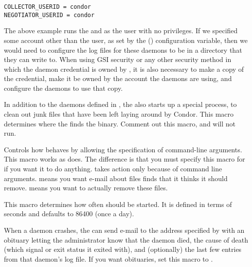 \begin{description}
\begin{verbatim}
COLLECTOR_USERID = condor
NEGOTIATOR_USERID = condor
\end{verbatim}

  The above example runs the  and 
  as the  user with no  privileges.
  If we specified some account other than the  user,
  as set by the () configuration variable, then we
  would need to configure the log files for these daemons to be in a
  directory that they can write to.  When using GSI security or any
  other security method in which the daemon credential is owned by ,
  it is also necessary to make a copy of the credential, make it be
  owned by the account the daemons are using, and configure the daemons
  to use that copy.

\label{param:Preen}
\item[\Macro{PREEN}]
  In addition to the daemons
  defined in , the  also starts up
  a special process,  to clean out junk files that have
  been left laying around by Condor.  This macro determines where the
   finds the  binary.
  Comment out this macro, and  will not run.

\label{param:PreenArgs}
\item[\Macro{PREEN\_ARGS}]
  Controls how  behaves by allowing the specification
  of command-line arguments.
  This macro works as  does.
  The difference is that you must specify this macro for
   if you want it to do anything.
   takes action only
  because of command line arguments.
   means you want e-mail about files  finds that it
  thinks it should remove.
   means you want  to actually remove these files.

\item[\Macro{PREEN\_INTERVAL}]
\label{param:PreenInterval}
  This macro determines how often  should be started.
  It is defined in terms of seconds and defaults to 86400 (once a day).

\label{param:PublishObituaries}
\item[\Macro{PUBLISH\_OBITUARIES}]
  When a daemon crashes, the  can send e-mail to the
  address specified by  with an obituary letting
  the administrator know that the daemon died, the cause of
  death (which signal or exit status it exited with), and
  (optionally) the last few entries from that daemon's log file.  If
  you want obituaries, set this macro to .


\end{description}
